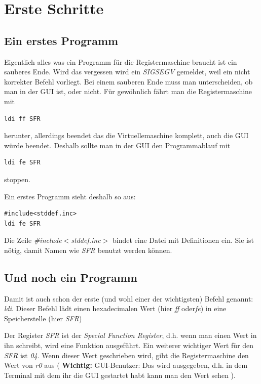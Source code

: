 \documentclass[a4paper,12pt,oneside]{scrreprt}
\begin{document}
\chapter{Erste Schritte}

\section{Ein erstes Programm}

Eigentlich alles was ein Programm für die Registermaschine braucht ist ein sauberes Ende. Wird das vergessen wird ein \textit{SIGSEGV} gemeldet, weil ein nicht korrekter Befehl vorliegt. Bei einem sauberen Ende muss man unterscheiden, ob man in der GUI ist, oder nicht. Für gewöhnlich fährt man die Registermaschine mit

\begin{lstlisting}[frame=single]
ldi ff SFR
\end{lstlisting}

herunter, allerdings beendet das die Virtuellemaschine komplett, auch die GUI würde beendet.  
Deshalb sollte man in der GUI den Programmablauf mit

\begin{lstlisting}[frame=single]
ldi fe SFR
\end{lstlisting}

stoppen.

Ein erstes Programm sieht deshalb so aus:

\begin{lstlisting}[frame=single]
#include<stddef.inc>
ldi fe SFR
\end{lstlisting}

Die Zeile \textit{\#include$<$stddef.inc$>$} bindet eine Datei mit Definitionen ein. Sie ist nötig, damit Namen wie \textit{SFR} benutzt werden können.


\section{Und noch ein Programm}

Damit ist auch schon der erste (und wohl einer der wichtigsten) Befehl genannt: \textit{ldi}.  
Dieser Befehl lädt einen hexadecimalen Wert (hier \textit{ff} oder\textit{fe}) in eine Speicherstelle (hier \textit{SFR})

Der Register \textit{SFR} ist der \textit{Special Function Register}, d.h. wenn man einen Wert in ihn schreibt, wird eine Funktion ausgeführt. Ein weiterer wichtiger Wert für den \textit{SFR} ist \textit{04}. Wenn dieser Wert geschrieben wird, gibt die Registermaschine den Wert von \textit{r0} aus ( \textbf{Wichtig:} GUI-Benutzer: Das wird ausgegeben, d.h. in dem Terminal mit dem ihr die GUI gestartet habt kann man den Wert sehen ).
\end{document}
